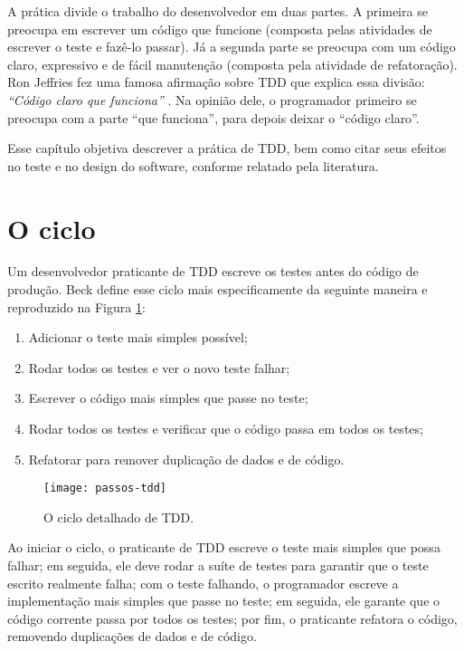A prática divide o trabalho do desenvolvedor em duas partes.
A primeira se preocupa em escrever um código que funcione (composta pelas
atividades de escrever o teste e fazê-lo passar). Já a segunda parte se preocupa
com um código claro, expressivo e de fácil manutenção (composta pela atividade
de refatoração). Ron Jeffries fez uma famosa afirmação sobre TDD que explica
essa divisão: \textit{``Código claro que funciona''} \cite{TDDByExample}. Na
opinião dele, o programador primeiro se preocupa com a parte ``que funciona'', 
para depois deixar o ``código claro''.

Esse capítulo objetiva descrever a prática de TDD, bem como citar
seus efeitos no teste e no design do software, conforme relatado pela
literatura.

\section{O ciclo}

Um desenvolvedor praticante de TDD escreve os testes antes do código de
produção. Beck define esse ciclo mais especificamente da seguinte maneira
\cite{TDDByExample} e reproduzido na Figura \ref{fig:passos-tdd}:

\begin{enumerate}
	\item Adicionar o teste mais simples possível; 
	\item Rodar todos os testes e ver o novo teste falhar; 
	\item Escrever o código mais simples que passe no teste; 
	\item Rodar todos os testes e verificar que o código passa em todos os testes; 
	\item Refatorar para remover duplicação de dados e de código.
\end{enumerate}

\begin{figure}
  \centering
  \texttt{[image: passos-tdd]}
  \caption{O ciclo detalhado de TDD.}
  \label{fig:passos-tdd}
\end{figure}

Ao iniciar o ciclo, o praticante de TDD escreve o teste mais simples que
possa falhar; em seguida, ele deve rodar a suíte de testes para 
garantir que o teste escrito realmente falha; 
com o teste falhando, o programador escreve a
implementação mais simples que passe no teste; em
seguida, ele garante que o código corrente passa por todos os testes; por fim, o praticante
refatora o código, removendo duplicações de dados e de código.

